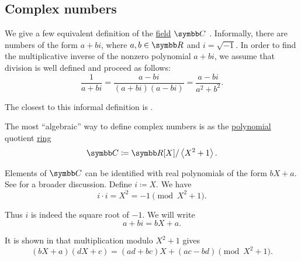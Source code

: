 \subsection{Complex numbers}\label{subsec:complex_numbers}

\begin{definition}\label{def:complex_numbers}
  We give a few equivalent definition of the \hyperref[def:field]{field} \( \BC \) . Informally, there are numbers of the form \( a + bi \), where \( a, b \in \BR \) and \( i = \sqrt{-1} \). In order to find the multiplicative inverse of the nonzero polynomial \( a + bi \), we assume that division is well defined and proceed as follows:
  \begin{equation}\label{def:complex_numbers/inverse}
    \frac 1 {a + bi} = \frac {a - bi} {(a + bi)(a - bi)} = \frac{a - bi}{a^2 + b^2}.
  \end{equation}

  The closest to this informal definition is .

  \begin{DefEnum}
     The most \enquote{algebraic} way to define complex numbers is as the \hyperref[def:polynomial]{polynomial} quotient \hyperref[thm:polynomial_quotient_rings_equinumerous_with_module_of_polynomials]{ring}
    \begin{equation*}
      \BC \coloneqq \BR[X] / \Gen{X^2 + 1}.
    \end{equation*}

    Elements of \( \BC \) can be identified with real polynomials of the form \( bX + a \). See  for a broader discussion.
    Define \( i \coloneqq X \). We have
    \begin{equation*}
      i \cdot i = X^2 = -1 \pmod {X^2 + 1}.
    \end{equation*}

    Thus \( i \) is indeed the square root of \( -1 \). We will write
    \begin{equation*}
      a + bi = bX + a.
    \end{equation*}

    It is shown in  that multiplication modulo \( X^2 + 1 \) gives
    \begin{equation}\label{def:complex_numbers/polynomials/multiplication}
      (bX + a) (dX + c) = (ad + bc)X + (ac - bd) \pmod {X^2 + 1}.
    \end{equation}


\end{DefEnum}
\end{definition}
